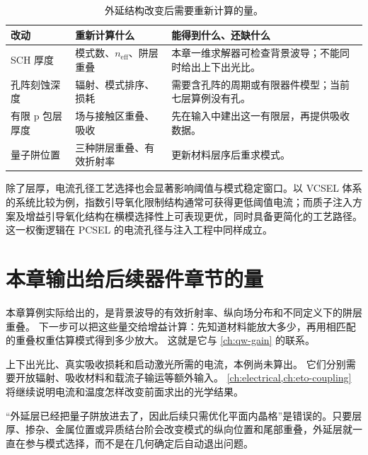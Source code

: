 \begin{table}[htbp]
  \centering
  \footnotesize
  \caption{外延结构改变后需要重新计算的量。}
  \label{tab:ch16_thickness_sensitivity}
  \setlength{\tabcolsep}{4pt}
  \begin{tabularx}{\textwidth}{@{}p{}p{}Y@{}}
    \toprule
    改动 & 重新计算什么 & 能得到什么、还缺什么 \\
    \midrule
    SCH 厚度 & 模式数、$n_{\mathrm{eff}}$、阱层重叠 & 本章一维求解器可检查背景波导；不能同时给出上下出光比。 \\
    孔阵刻蚀深度 & 辐射、模式排序、损耗 & 需要含孔阵的周期或有限器件模型；当前七层算例没有孔。 \\
    有限 p 包层厚度 & 场与接触区重叠、吸收 & 先在输入中建出这一有限层，再提供吸收数据。 \\
    量子阱位置 & 三种阱层重叠、有效折射率 & 更新材料层序后重求模式。 \\
    \bottomrule
  \end{tabularx}
\end{table}

除了层厚，电流孔径工艺选择也会显著影响阈值与模式稳定窗口。以 VCSEL 体系的系统比较为例，指数引导氧化限制结构通常可获得更低阈值电流；而质子注入方案及增益引导氧化结构在横模选择性上可表现更优，同时具备更简化的工艺路径\cite{sarzala2010oxideproton}。这一权衡逻辑在 PCSEL 的电流孔径与注入工程中同样成立。



\section{本章输出给后续器件章节的量}
本章算例实际给出的，是背景波导的有效折射率、纵向场分布和不同定义下的阱层重叠。
下一步可以把这些量交给增益计算：先知道材料能放大多少，再用相匹配的重叠权重估算模式得到多少放大。
这就是它与 \cref{ch:qw-gain} 的联系。

上下出光比、真实吸收损耗和启动激光所需的电流，本例尚未算出。
它们分别需要开放辐射、吸收材料和载流子输运等额外输入。
\cref{ch:electrical,ch:eto-coupling} 将继续说明电流和温度怎样改变前面求出的光学结果。

\begin{PitfallBox}
“外延层已经把量子阱放进去了，因此后续只需优化平面内晶格”是错误的。只要层厚、掺杂、金属位置或异质结台阶会改变模式的纵向位置和尾部重叠，外延层就一直在参与模式选择，而不是在几何确定后自动退出问题。
\end{PitfallBox}

